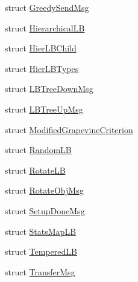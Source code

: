\begin{DoxyCompactItemize}
struct \hyperlink{structvt_1_1vrt_1_1collection_1_1lb_1_1_greedy_send_msg}{Greedy\+Send\+Msg}
\item 
struct \hyperlink{structvt_1_1vrt_1_1collection_1_1lb_1_1_hierarchical_l_b}{Hierarchical\+LB}
\item 
struct \hyperlink{structvt_1_1vrt_1_1collection_1_1lb_1_1_hier_l_b_child}{Hier\+L\+B\+Child}
\item 
struct \hyperlink{structvt_1_1vrt_1_1collection_1_1lb_1_1_hier_l_b_types}{Hier\+L\+B\+Types}
\item 
struct \hyperlink{structvt_1_1vrt_1_1collection_1_1lb_1_1_l_b_tree_down_msg}{L\+B\+Tree\+Down\+Msg}
\item 
struct \hyperlink{structvt_1_1vrt_1_1collection_1_1lb_1_1_l_b_tree_up_msg}{L\+B\+Tree\+Up\+Msg}
\item 
struct \hyperlink{structvt_1_1vrt_1_1collection_1_1lb_1_1_modified_grapevine_criterion}{Modified\+Grapevine\+Criterion}
\item 
struct \hyperlink{structvt_1_1vrt_1_1collection_1_1lb_1_1_random_l_b}{Random\+LB}
\item 
struct \hyperlink{structvt_1_1vrt_1_1collection_1_1lb_1_1_rotate_l_b}{Rotate\+LB}
\item 
struct \hyperlink{structvt_1_1vrt_1_1collection_1_1lb_1_1_rotate_obj_msg}{Rotate\+Obj\+Msg}
\item 
struct \hyperlink{structvt_1_1vrt_1_1collection_1_1lb_1_1_setup_done_msg}{Setup\+Done\+Msg}
\item 
struct \hyperlink{structvt_1_1vrt_1_1collection_1_1lb_1_1_stats_map_l_b}{Stats\+Map\+LB}
\item 
struct \hyperlink{structvt_1_1vrt_1_1collection_1_1lb_1_1_tempered_l_b}{Tempered\+LB}
\item 
struct \hyperlink{structvt_1_1vrt_1_1collection_1_1lb_1_1_transfer_msg}{Transfer\+Msg}
\end{DoxyCompactItemize}
